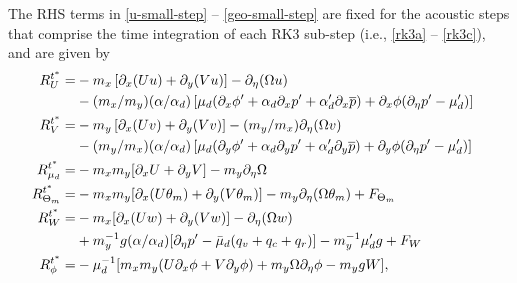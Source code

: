 %
\noindent
The RHS terms in \eqref{u-small-step} -- \eqref{geo-small-step} are
fixed for the acoustic steps that comprise the time integration of each
RK3 sub-step (i.e., \eqref{rk3a} -- \eqref{rk3c}),
and are given by
%
\begin{align}
R_U^{t^*} = & - m_x\left[\partial_x (Uu) + \partial_y (Vu)\right] - \partial_\eta (\Omega u)  & \cr
& -(m_x/m_y) (\alpha/\alpha_d) \left[ \mu_d (\partial_x \phi' + \alpha_d \partial_x p' + \alpha'_d \partial_x \overline{p}) +
\partial_x \phi (\partial_\eta p' - \mu'_d)\right]
\label{u-rhs}
\\
%
R_V^{t^*} = & - m_y\left[\partial_x (Uv) + \partial_y (Vv)\right] - (m_y/m_x) \partial_\eta (\Omega v)  & \cr
& -(m_y/m_x) (\alpha/\alpha_d) \left[ \mu_d (\partial_y \phi' + \alpha_d \partial_y p' + \alpha'_d \partial_y \overline{p}) +
\partial_y \phi (\partial_\eta p' - \mu'_d)\right]
\label{v-rhs}
\\ 
%
R_{\mu_d}^{t^*} = &
- m_x m_y[\partial_x U + \partial_y V] - m_y \partial_\eta \Omega
\label{mu-rhs}
\\
R_{\Theta_m}^{t^*} = &
- m_x m_y [\partial_x (U\theta_m) + \partial_y (V\theta_m)] - m_y \partial_\eta
(\Omega \theta_m) + F_{\Theta_m}
\label{theta-rhs}
\\
%
R_W^{t^*} = &
- m_x [\partial_x (Uw) + \partial_y (Vw)] - \partial_\eta
(\Omega w)  ~~~~~~~~ ~~~~~~~~ ~~~~~~~~ ~~~~~~~~ ~~~ \notag 
\\
& + m_y^{-1} g (\alpha/\alpha_d) [\partial_\eta p' 
  - {\bar{\mu}}_d (q_v + q_c +q_r)]
  - m_y^{-1} {\mu}_d'g + F_W
\label{w-rhs} 
\\
%
R_\phi^{t^*} = &
- \mu_d^{-1}
[m_x m_y (U\partial_x\phi + V\partial_y\phi) + m_y
\Omega\partial_\eta\phi - m_y gW ],
\label{geo-rhs}
%
\end{align}

